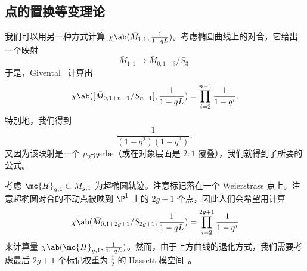 \subsection{点的置换等变理论}%
\label{sub:Permutation-equivariant theory of a point}

我们可以用另一种方式计算 \(\chi\ab(\bar{M}_{1,1}, \frac{1}{1-q L})\)。考虑椭圆曲线上的对合，它给出一个映射
\[ \bar{M}_{1,1} \to \bar{M}_{0,1+3}/S_3. \]
于是，Givental~\cite{Givental2017K1} 计算出
\[ \chi\ab([\bar{M}_{0,1+n-1}/S_{n-1}], \frac{1}{1-qL}) = \prod_{i=2}^{n-1} \frac{1}{1-q^i}. \]
特别地，我们得到
\[ \frac{1}{(1-q^2)(1-q^3)}, \]
又因为该映射是一个 \(\mu_2\)-gerbe（或在对象层面是 \(2:1\) 覆叠），我们就得到了所要的公式。

考虑 \(\mc{H}_{g,1} \subset \bar{M}_{g,1}\) 为超椭圆轨迹。注意标记落在一个 Weierstrass 点上。注意超椭圆对合的不动点被映到 \(\P^1\) 上的 \(2g+1\) 个点，因此人们会希望用计算
\[ \chi\ab(\bar{M}_{0,1+2g+1}/S_{2g+1}, \frac{1}{1-q L}) = \prod_{i=2}^{2g+1} \frac{1}{1-q^i} \]
来计算量
\(\chi\ab(\mc{H}_{g,1}, \frac{1}{1-qL})\)。然而，由于上方曲线的退化方式，我们需要考虑最后 \(2g+1\) 个标记权重为 \(\frac{1}{2}\) 的 Hassett 模空间~\cite{Hassett2003}。
 






